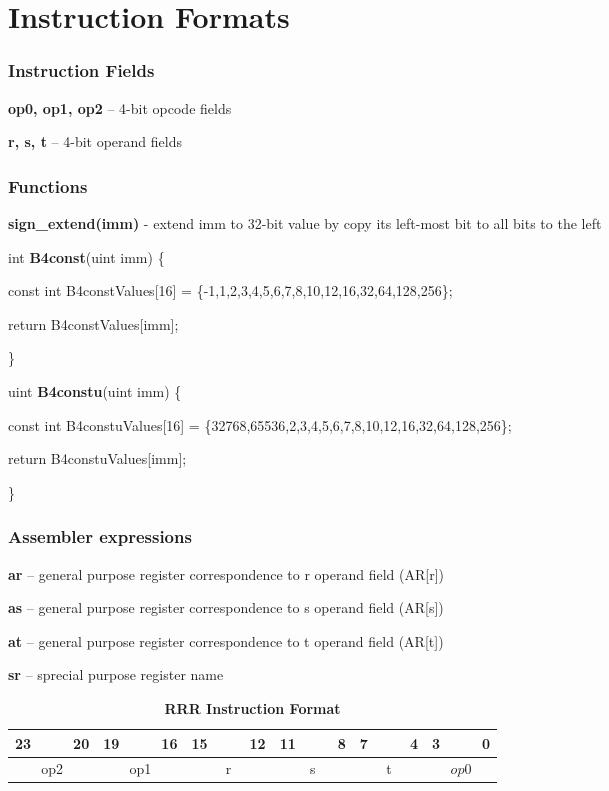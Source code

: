 \chapter{Instruction Formats}


\subsection {Instruction Fields}

  \textbf{op0, op1, op2} – 4-bit opcode fields

  \textbf{r, s, t} – 4-bit operand fields

\subsection {Functions}


\textbf{sign\_extend(imm)} - extend imm to 32-bit value by copy its left-most bit to all bits to the left 

int \textbf{ B4const}(uint imm) \{
	
	const int B4constValues[16] = \{-1,1,2,3,4,5,6,7,8,10,12,16,32,64,128,256\};
	
	return  B4constValues[imm];
	
\}


uint \textbf{B4constu}(uint imm) \{
	
	const int B4constuValues[16] = \{32768,65536,2,3,4,5,6,7,8,10,12,16,32,64,128,256\};
	
	return  B4constuValues[imm];
	
\}


\subsection {Assembler expressions}

\textbf{ar} – general purpose register correspondence to r operand field (AR[r])

\textbf{as} – general purpose register correspondence to s operand field (AR[s])

\textbf{at} – general purpose register correspondence to t operand field (AR[t])

\textbf{sr} – sprecial purpose register name


\setlength{\tabcolsep}{8pt}

\begin{table}[H]
	\caption{\textbf{RRR Instruction Format}}
	\begin{tabular}{llllllllllllllllllllllll}
       23 & & & 20 & 19 & & & 16 & 15 & & & 12 & 11 & & & 8 & 7 & & & 4 & 3 & & & 0 \\
		\hline
		\multicolumn{4}{|c|}{op2} & \multicolumn{4}{c|}{op1} & \multicolumn{4}{c|}{r} & \multicolumn{4}{c|}{s} & \multicolumn{4}{c|}{t} & \multicolumn{4}{c|}{$op0$}\\
		\hline
	\end{tabular}
\end{table}


